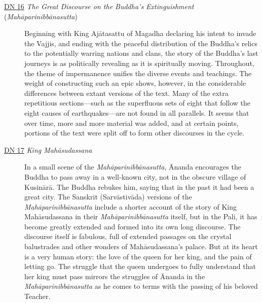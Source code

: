 \documentclass[12pt,openany]{book}%
\begin{document}
\begin{description}%
\item[\href{https://suttacentral.net/dn16}{DN 16} \textit{The Great Discourse on the Buddha’s Extinguishment} (\textit{\textsanskrit{Mahāparinibbānasutta}})] Beginning with King \textsanskrit{Ajātasattu} of Magadha declaring his intent to invade the Vajjis, and ending with the peaceful distribution of the Buddha’s relics to the potentially warring nations and clans, the story of the Buddha’s last journeys is as politically revealing as it is spiritually moving. Throughout, the theme of impermanence unifies the diverse events and teachings. The weight of constructing such an epic shows, however, in the considerable differences between extant versions of the text. Many of the extra repetitious sections—such as the superfluous sets of eight that follow the eight causes of earthquakes—are not found in all parallels. It seems that over time, more and more material was added, and at certain points, portions of the text were split off to form other discourses in the cycle.%
\item[\href{https://suttacentral.net/dn17}{DN 17} \textit{King \textsanskrit{Mahāsudassana}}] In a small scene of the \textit{\textsanskrit{Mahāparinibbānasutta}}, Ānanda encourages the Buddha to pass away in a well-known city, not in the obscure village of \textsanskrit{Kusinārā}. The Buddha rebukes him, saying that in the past it had been a great city. The Sanskrit (\textsanskrit{Sarvāstivāda}) versions of the \textit{\textsanskrit{Mahāparinibbānasutta}} include a shorter account of the story of King \textsanskrit{Mahāsudassana} in their \textit{\textsanskrit{Mahāparinibbānasutta}} itself, but in the Pali, it has become greatly extended and formed into its own long discourse. The discourse itself is fabulous, full of extended passages on the crystal balustrades and other wonders of \textsanskrit{Mahāsudassana}’s palace. But at its heart is a very human story: the love of the queen for her king, and the pain of letting go. The struggle that the queen undergoes to fully understand that her king must pass mirrors the struggles of Ānanda in the \textit{\textsanskrit{Mahāparinibbānasutta}} as he comes to terms with the passing of his beloved Teacher.%

\end{description}
\end{document}
